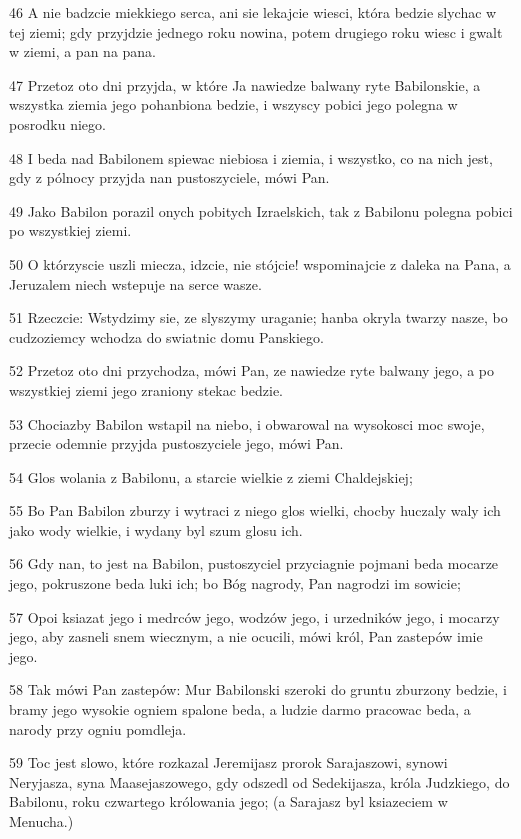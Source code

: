 \par 46 A nie badzcie miekkiego serca, ani sie lekajcie wiesci, która bedzie slychac w tej ziemi; gdy przyjdzie jednego roku nowina, potem drugiego roku wiesc i gwalt w ziemi, a pan na pana.
\par 47 Przetoz oto dni przyjda, w które Ja nawiedze balwany ryte Babilonskie, a wszystka ziemia jego pohanbiona bedzie, i wszyscy pobici jego polegna w posrodku niego.
\par 48 I beda nad Babilonem spiewac niebiosa i ziemia, i wszystko, co na nich jest, gdy z pólnocy przyjda nan pustoszyciele, mówi Pan.
\par 49 Jako Babilon porazil onych pobitych Izraelskich, tak z Babilonu polegna pobici po wszystkiej ziemi.
\par 50 O którzyscie uszli miecza, idzcie, nie stójcie! wspominajcie z daleka na Pana, a Jeruzalem niech wstepuje na serce wasze.
\par 51 Rzeczcie: Wstydzimy sie, ze slyszymy uraganie; hanba okryla twarzy nasze, bo cudzoziemcy wchodza do swiatnic domu Panskiego.
\par 52 Przetoz oto dni przychodza, mówi Pan, ze nawiedze ryte balwany jego, a po wszystkiej ziemi jego zraniony stekac bedzie.
\par 53 Chociazby Babilon wstapil na niebo, i obwarowal na wysokosci moc swoje, przecie odemnie przyjda pustoszyciele jego, mówi Pan.
\par 54 Glos wolania z Babilonu, a starcie wielkie z ziemi Chaldejskiej;
\par 55 Bo Pan Babilon zburzy i wytraci z niego glos wielki, chocby huczaly waly ich jako wody wielkie, i wydany byl szum glosu ich.
\par 56 Gdy nan, to jest na Babilon, pustoszyciel przyciagnie pojmani beda mocarze jego, pokruszone beda luki ich; bo Bóg nagrody, Pan nagrodzi im sowicie;
\par 57 Opoi ksiazat jego i medrców jego, wodzów jego, i urzedników jego, i mocarzy jego, aby zasneli snem wiecznym, a nie ocucili, mówi król, Pan zastepów imie jego.
\par 58 Tak mówi Pan zastepów: Mur Babilonski szeroki do gruntu zburzony bedzie, i bramy jego wysokie ogniem spalone beda, a ludzie darmo pracowac beda, a narody przy ogniu pomdleja.
\par 59 Toc jest slowo, które rozkazal Jeremijasz prorok Sarajaszowi, synowi Neryjasza, syna Maasejaszowego, gdy odszedl od Sedekijasza, króla Judzkiego, do Babilonu, roku czwartego królowania jego; (a Sarajasz byl ksiazeciem w Menucha.)
